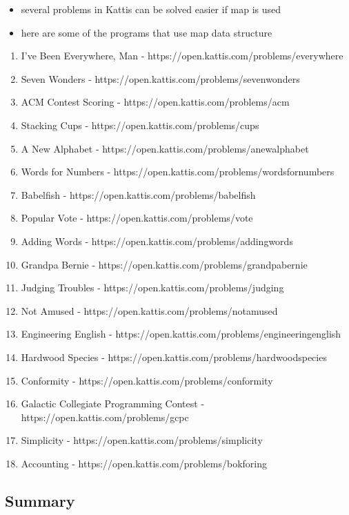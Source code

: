\documentclass[11pt]{article}
\providecommand{\tightlist}{%
      \setlength{\itemsep}{0pt}\setlength{\parskip}{0pt}}
\begin{document}
\begin{itemize}
\tightlist
\item
  several problems in Kattis can be solved easier if map is used
\item
  here are some of the programs that use map data structure
\end{itemize}

\begin{enumerate}
\def\labelenumi{\arabic{enumi}.}
\item
  I've Been Everywhere, Man -
  https://open.kattis.com/problems/everywhere
\item
  Seven Wonders - https://open.kattis.com/problems/sevenwonders
\item
  ACM Contest Scoring - https://open.kattis.com/problems/acm
\item
  Stacking Cups - https://open.kattis.com/problems/cups
\item
  A New Alphabet - https://open.kattis.com/problems/anewalphabet
\item
  Words for Numbers - https://open.kattis.com/problems/wordsfornumbers
\item
  Babelfish - https://open.kattis.com/problems/babelfish
\item
  Popular Vote - https://open.kattis.com/problems/vote
\item
  Adding Words - https://open.kattis.com/problems/addingwords
\item
  Grandpa Bernie - https://open.kattis.com/problems/grandpabernie
\item
  Judging Troubles - https://open.kattis.com/problems/judging
\item
  Not Amused - https://open.kattis.com/problems/notamused
\item
  Engineering English -
  https://open.kattis.com/problems/engineeringenglish
\item
  Hardwood Species - https://open.kattis.com/problems/hardwoodspecies
\item
  Conformity - https://open.kattis.com/problems/conformity
\item
  Galactic Collegiate Programming Contest -
  https://open.kattis.com/problems/gcpc
\item
  Simplicity - https://open.kattis.com/problems/simplicity
\item
  Accounting - https://open.kattis.com/problems/bokforing
\end{enumerate}

    \hypertarget{summary}{%
\subsection{Summary}\label{summary}}
\end{document}
